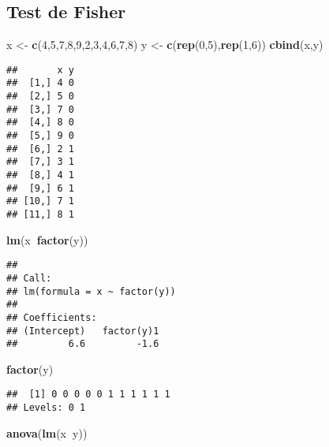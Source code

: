 \documentclass[
]{article}
\newenvironment{Shaded}{\begin{snugshade}}{\end{snugshade}}
\newcommand{\DecValTok}[1]{\textcolor[rgb]{0.00,0.00,0.81}{#1}}
\newcommand{\KeywordTok}[1]{\textcolor[rgb]{0.13,0.29,0.53}{\textbf{#1}}}
\newcommand{\NormalTok}[1]{#1}
\newcommand{\OperatorTok}[1]{\textcolor[rgb]{0.81,0.36,0.00}{\textbf{#1}}}
\newcommand{\StringTok}[1]{\textcolor[rgb]{0.31,0.60,0.02}{#1}}
\begin{document}
\hypertarget{test-de-fisher}{%
\subsection{Test de Fisher}\label{test-de-fisher}}

\begin{Shaded}
\begin{Highlighting}[]
\NormalTok{x <-}\StringTok{ }\KeywordTok{c}\NormalTok{(}\DecValTok{4}\NormalTok{,}\DecValTok{5}\NormalTok{,}\DecValTok{7}\NormalTok{,}\DecValTok{8}\NormalTok{,}\DecValTok{9}\NormalTok{,}\DecValTok{2}\NormalTok{,}\DecValTok{3}\NormalTok{,}\DecValTok{4}\NormalTok{,}\DecValTok{6}\NormalTok{,}\DecValTok{7}\NormalTok{,}\DecValTok{8}\NormalTok{)}
\NormalTok{y <-}\StringTok{ }\KeywordTok{c}\NormalTok{(}\KeywordTok{rep}\NormalTok{(}\DecValTok{0}\NormalTok{,}\DecValTok{5}\NormalTok{),}\KeywordTok{rep}\NormalTok{(}\DecValTok{1}\NormalTok{,}\DecValTok{6}\NormalTok{))}
\KeywordTok{cbind}\NormalTok{(x,y)}
\end{Highlighting}
\end{Shaded}

\begin{verbatim}
##       x y
##  [1,] 4 0
##  [2,] 5 0
##  [3,] 7 0
##  [4,] 8 0
##  [5,] 9 0
##  [6,] 2 1
##  [7,] 3 1
##  [8,] 4 1
##  [9,] 6 1
## [10,] 7 1
## [11,] 8 1
\end{verbatim}

\begin{Shaded}
\begin{Highlighting}[]
\KeywordTok{lm}\NormalTok{(x}\OperatorTok{~}\KeywordTok{factor}\NormalTok{(y))}
\end{Highlighting}
\end{Shaded}

\begin{verbatim}
## 
## Call:
## lm(formula = x ~ factor(y))
## 
## Coefficients:
## (Intercept)   factor(y)1  
##         6.6         -1.6
\end{verbatim}

\begin{Shaded}
\begin{Highlighting}[]
\KeywordTok{factor}\NormalTok{(y)}
\end{Highlighting}
\end{Shaded}

\begin{verbatim}
##  [1] 0 0 0 0 0 1 1 1 1 1 1
## Levels: 0 1
\end{verbatim}

\begin{Shaded}
\begin{Highlighting}[]
\KeywordTok{anova}\NormalTok{(}\KeywordTok{lm}\NormalTok{(x}\OperatorTok{~}\NormalTok{y))}
\end{Highlighting}
\end{Shaded}
\end{document}

